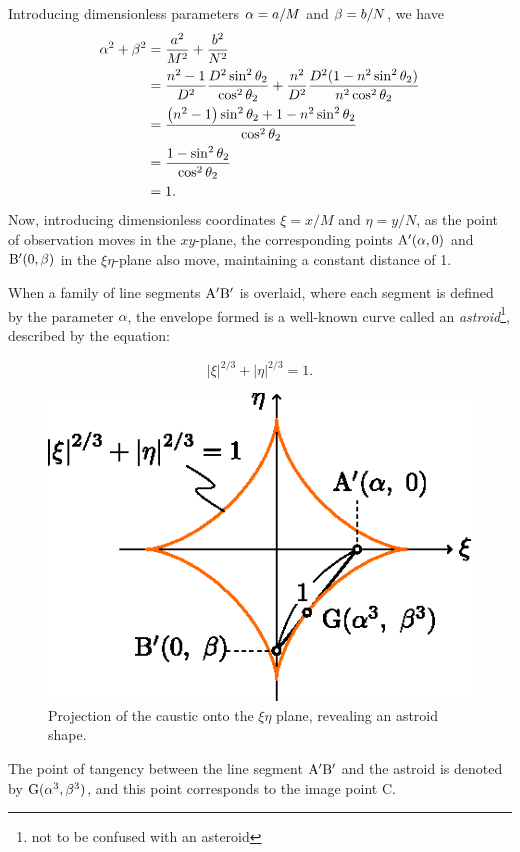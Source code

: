\documentclass[twocolumn]{article}
\begin{document}
Introducing dimensionless parameters ${\alpha}={a}/M$ and ${\beta}={b}/N$, we have
$$ \begin{aligned}
	\greeka^2 + \greekb^2 &= \dfrac{\romana^2}{M^2}+\dfrac{\romanb^2}{N^2}\\
	&=\dfrac{n^2-1}{D^2}\dfrac{D^2\sin^2\theta_2}{\cos^2\theta_2}%
	+\dfrac{n^2}{D^2}\dfrac{D^2(1-n^2\sin^2\theta_2)}{n^2\cos^2\theta_2}\\
	&=\dfrac{\left(n^2-1\right)\sin^2\theta_2 + 1-n^2\sin^2\theta_2}
	{\cos^2\theta_2}\\
	&=\dfrac{1-\sin^2\theta_2}{\cos^2\theta_2}\\
	&= 1.
\end{aligned}$$
Now, introducing dimensionless coordinates $\xi=x/M$ and $\eta=y/N$, as the point of observation moves in the $xy$-plane, the corresponding points $\mathrm{{A^{\prime}}}(\alpha, 0)$ and $\mathrm{{B^{\prime}}}(0, \beta)$ in the $\xi\eta$-plane also move, maintaining a constant distance of 1. 

When a family of line segments ${\mathrm{{A^{\prime}}{B^{\prime}}}}$ is overlaid, where each segment is defined by the parameter $\alpha$, the envelope formed is a well-known curve called an \emph{astroid}\footnote{not to be confused with an asteroid}, described by the equation:

$$ \left| \xi \right|^{2/3} + \left| \eta \right|^{2/3} = 1. $$

\begin{figure}
	\centering
	\includegraphics{figs/g107.eps}	
	\caption{Projection of the caustic onto the $\xi\eta$ plane, revealing an astroid shape.}
	\label{fig:astroid}
\end{figure}

The point of tangency between the line segment ${\mathrm{{A^{\prime}}{B^{\prime}}}}$ and the astroid is denoted by $\mathrm{G}({\alpha}^3, {\beta}^3)$, and this point corresponds to the image point C. 
\end{document}
